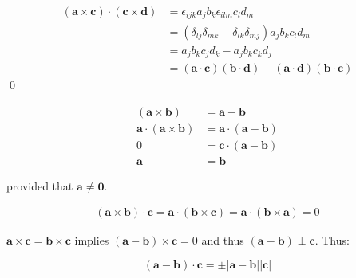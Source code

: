 \documentclass[12pt]{article}
\begin{document}
\begin{equation}
    \begin{split}
        (\mathbf{a} \times \mathbf{c}) \cdot (\mathbf{c} \times \mathbf{d}) &= \epsilon_{ijk} a_{j} b_{k} \epsilon_{ilm} c_{l} d_{m} \\
        &= (\delta_{lj} \delta_{mk} - \delta_{lk} \delta_{mj}) a_{j} b_{k} c_{l} d_{m} \\
        &= a_{j} b_{k} c_{j} d_{k} - a_{j} b_{k} c_{k} d_{j} \\
        &= (\mathbf{a} \cdot \mathbf{c}) (\mathbf{b} \cdot \mathbf{d}) - (\mathbf{a} \cdot \mathbf{d}) (\mathbf{b} \cdot \mathbf{c})
    \end{split}
\end{equation}
\qed




\begin{equation}
    \begin{split}
        (\mathbf{a} \times \mathbf{b}) &= \mathbf{a} - \mathbf{b} \\
        \mathbf{a} \cdot (\mathbf{a} \times \mathbf{b}) &= \mathbf{a} \cdot (\mathbf{a} - \mathbf{b}) \\
        0 &= \mathbf{c} \cdot (\mathbf{a} - \mathbf{b}) \\
        \mathbf{a} &= \mathbf{b}
    \end{split}
\end{equation}

provided that $\mathbf{a} \ne \mathbf{0}$.


\begin{equation}
    \begin{split}
        (\mathbf{a} \times \mathbf{b}) \cdot \mathbf{c} = \mathbf{a} \cdot (\mathbf{b} \times \mathbf{c}) = \mathbf{a} \cdot (\mathbf{b} \times \mathbf{a}) = 0
    \end{split}
\end{equation}

$\mathbf{a} \times \mathbf{c} = \mathbf{b} \times \mathbf{c}$ implies $(\mathbf{a} -\mathbf{b}) \times \mathbf{c} = 0$ and thus $(\mathbf{a} - \mathbf{b}) \perp \mathbf{c}$. Thus:

\begin{equation}
    (\mathbf{a} - \mathbf{b}) \cdot \mathbf{c} = \pm \left\lvert \mathbf{a} - \mathbf{b} \right\rvert \left\lvert \mathbf{c} \right\rvert
\end{equation}
\end{document}
